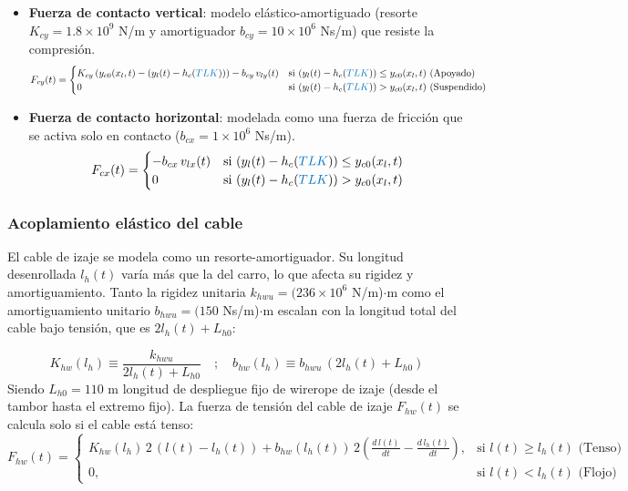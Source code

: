 \documentclass{article}
\begin{document}
\begin{itemize}
\item \textbf{Fuerza de contacto vertical}: modelo elástico-amortiguado (resorte $K_{cy} = 1.8 \times 10^9$ N/m y amortiguador $b_{cy} = 10 \times 10^6$ Ns/m) que resiste la compresión.
\begin{equation}
    F_{cy}(t) = 
    \begin{cases} 
        K_{cy} \, (y_{c0}(x_l,t) - (y_l(t) - h_c(\textcolor{signalcolor}{TLK}))) - b_{cy} \, v_{ly}(t) & \text{si } (y_l(t) - h_c(\textcolor{signalcolor}{TLK})) \le y_{c0}(x_l,t) \text{ (Apoyado)} \\
        0 & \text{si } (y_l(t) - h_c(\textcolor{signalcolor}{TLK})) > y_{c0}(x_l,t) \text{ (Suspendido)}
    \end{cases}
    \label{eq:fuerza_contacto_vertical}
\end{equation}
\item \textbf{Fuerza de contacto horizontal}: modelada como una fuerza de fricción que se activa solo en contacto ($b_{cx} = 1 \times 10^6$ Ns/m).
\begin{equation}
    F_{cx}(t) = 
    \begin{cases} 
        -b_{cx} \, v_{lx}(t) & \text{si } (y_l(t) - h_c(\textcolor{signalcolor}{TLK})) \le y_{c0}(x_l,t) \\
        0 & \text{si } (y_l(t) - h_c(\textcolor{signalcolor}{TLK})) > y_{c0}(x_l,t)
    \end{cases}
    \label{eq:fuerza_contacto_horizontal}
\end{equation}
\end{itemize}

\subsubsection{Acoplamiento elástico del cable}
El cable de izaje se modela como un resorte-amortiguador. Su longitud desenrollada $l_h(t)$ varía más que la del carro,
lo que afecta su rigidez y amortiguamiento. Tanto la rigidez unitaria $k_{hwu} = (236 \times 10^6$ N/m)$\cdot$m como el amortiguamiento unitario $b_{hwu} = (150$ Ns/m)$\cdot$m escalan
con la longitud total del cable bajo tensión, que es $2 l_h(t) + L_{h0}$:

\begin{equation}
    K_{hw}(l_h) \equiv \frac{k_{hwu}}{2 l_h(t) + L_{h0}} \quad ; \quad b_{hw}(l_h) \equiv b_{hwu}\,(2 l_h(t) + L_{h0})
    \label{eq:rigidez_amortiguamiento_variable}
\end{equation}
Siendo $L_{h0} = 110$ m longitud de despliegue fijo de wirerope de izaje (desde el tambor hasta el extremo fijo).
La fuerza de tensión del cable de izaje $F_{hw}(t)$ se calcula solo si el cable está tenso:
\begin{equation}
    F_{hw}(t) = 
    \begin{cases} 
        K_{hw}(l_h) \, 2 \, (l(t) - l_h(t)) + b_{hw}(l_h(t)) \, 2 \left( \frac{d \, l(t)}{dt} - \frac{d \, l_h(t)}{dt} \right), & \text{si } l(t) \ge l_h(t) \text{ (Tenso)} \\[6pt]
        0, & \text{si } l(t) < l_h(t) \text{ (Flojo)}
    \end{cases}
    \label{eq:fuerza_izaje}
\end{equation}
\end{document}
